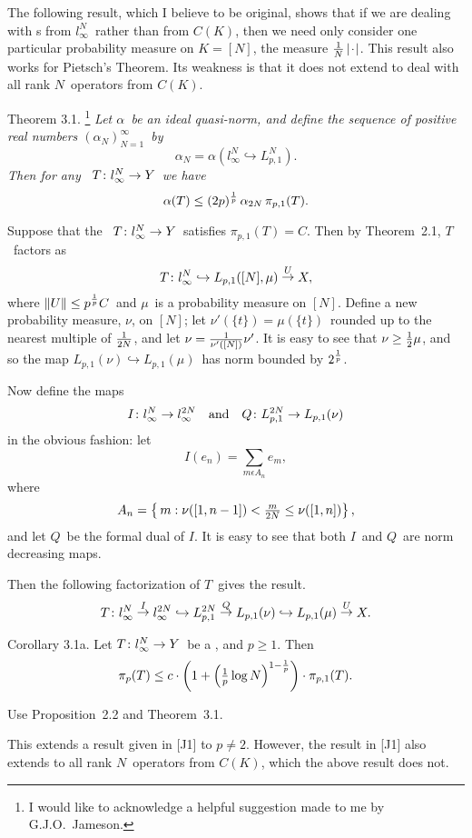 The following result, which I believe to be original, shows that
if we are
dealing with \blo s from $l_\infty^N$\ rather than from $C(K)$, then
we need
only consider one particular probability measure on $K=[N]$, the
measure ${1\over N}
\left| \kern0.8pt\cdot\kern0.8pt \right|$. This result also works for Pietsch's Theorem. Its weakness
is that it
does not extend to deal with all rank $N$\ operators from $C(K)$.
 
\proclaim Theorem 3.1. \rm\footnote*{\sevenrm I would like to acknowledge
a helpful suggestion made to me by G.J.O.~Jameson.}\sl
Let $\alpha$\ be an ideal quasi-norm, and
define the sequence of positive real numbers $(\alpha_N)_{N=1}^\infty$\
by
$$ \alpha_N = \alpha(l_\infty^N \hookrightarrow L_{p,1}^N).$$
Then for any \blo\ $T\colon l_\infty^N\to Y$\ we have
$$ \alpha(T) \le (2p)^{1\over p}\,\alpha_{2N}\,\pi_{p,1}(T).$$
 
\Proof
Suppose that the \blo\ $T\colon l_\infty^N\to Y$\ satisfies $\pi_{p,1}(T)=C$. Then
by Theorem~2.1, $T$\ factors as
$$ T\colon l_\infty^N \hookrightarrow L_{p,1}([N],\mu) \mathrel{\mathop\to^U}
X,$$
where $\left\| U \right\| \le p^{1\over p} C$\ and $\mu$\ is a probability measure
on $[N]$.
Define a new probability measure, $\nu$, on $[N]$; let
$\nu'(\{t\})=\mu(\{t\})$\ rounded up to the nearest multiple of ${1\over2N}$,
and let $\nu={1\over\nu'([N])} \nu'$. It is easy to see that $\nu
\ge
{\textstyle {1\over2}} \mu$, and so the map $ L_{p,1}(\nu)\hookrightarrow L_{p,1}(\mu)$\
has norm bounded by $2^{1\over p}$.
 
Now define the maps
$$ I\colon l_\infty^N \to l_\infty^{2N}
   \quad\hbox{and}\quad
   Q\colon L_{p,1}^{2N} \to L_{p,1}(\nu)$$
in the obvious fashion: let
$$ I(e_n)=\sum_{m\epsilon A_n} e_m ,$$
where
$$ A_n = \left\{\,m: \nu([1,n-1]) < \textstyle{m\over2N}
   \le \nu([1,n])\right\},$$
and let $Q$\ be the formal dual of $I$. It is easy to see that both
$I$\ and
$Q$\ are norm decreasing maps.
 
Then the following factorization of $T$\ gives the result.
$$T\colon l_\infty^N \mathrel{\mathop\to^I} l_\infty^{2N} \hookrightarrow
  L_{p,1}^{2N} \mathrel{\mathop\to^Q} L_{p,1}(\nu) \hookrightarrow
  L_{p,1}(\mu) \mathrel{\mathop\to^U} X.$$
\endproof
 
\proclaim Corollary 3.1a. Let $T\colon l_\infty^N\to Y$\ be a \blo, and $p\ge 1$.
Then
$$\pi_p(T) \le c\cdot\left(1+\left({\textstyle{{1\over p}}}\log N\right)^{1-{1\over p}}\right)
\cdot\pi_{p,1}(T).$$
 
\Proof Use Proposition~2.2 and Theorem~3.1.
\endproof
 
\bigskip
 
This extends a result given in [J1] to $p\ne2$. However, the result
in
[J1] also extends to all rank $N$\ operators from $C(K)$, which the
above
result does not.
 
